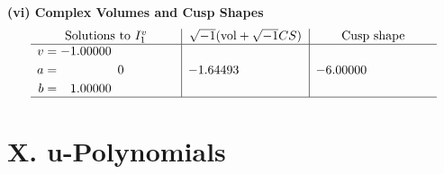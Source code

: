 \documentclass[1p]{elsarticle_modified}
\theoremstyle{definition}
\newcommand{\I}{\sqrt{-1}}
\begin{document}
\newpage\flushleft \textbf{(vi) Complex Volumes and Cusp Shapes}
$$\begin{array}{c|c|c}  
\text{Solutions to }I^v_{1}& \I (\text{vol} + \sqrt{-1}CS) & \text{Cusp shape}\\
 \hline 
\begin{aligned}
v &= -1.00000\phantom{ +0.000000I} \\
a &= \phantom{-0.000000 } 0 \\
b &= \phantom{-}1.00000\phantom{ +0.000000I}\end{aligned}
 & -1.64493\phantom{ +0.000000I} & -6.00000\phantom{ +0.000000I}\\
 \hline 
 \end{array}$$\newpage
\newpage\renewcommand{\arraystretch}{1}
\centering \section*{ X. u-Polynomials}
\end{document}
